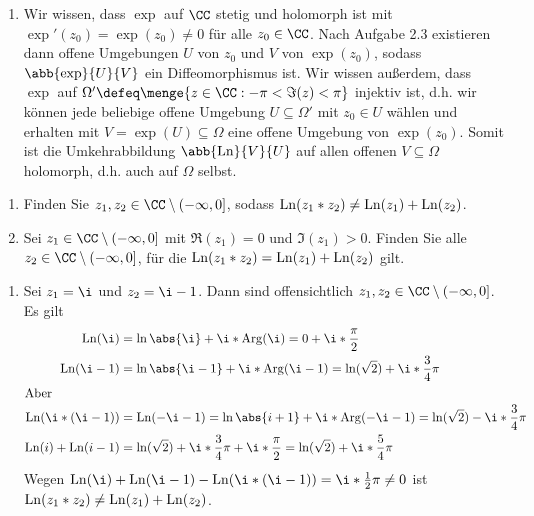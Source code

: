 \begin{exercisePage}
\begin{enumerate}[label=(zu \alph*), leftmargin=*]
		\item Wir wissen, dass $\exp$ auf $\CC$ stetig und holomorph ist mit $\exp'(z_0) = \exp(z_0) \neq 0$ für alle $z_0 \in \CC$. Nach Aufgabe 2.3 existieren dann offene Umgebungen $U$ von $z_0$ und $V$ von $\exp(z_0)$, sodass $\abb{\exp}{U}{V}$ ein Diffeomorphismus ist. 
		Wir wissen außerdem, dass $\exp$ auf $\Omega' \defeq \menge{z \in \CC : - \pi < \Im(z) < \pi}$ injektiv ist, d.h. wir können jede beliebige offene Umgebung $U \subseteq \Omega'$ mit $z_0 \in U$ wählen und erhalten mit $V = \exp(U) \subseteq \Omega$ eine offene Umgebung von $\exp(z_0)$. Somit ist die Umkehrabbildung $\abb{\Ln}{V}{U}$ auf allen offenen $V \subseteq \Omega$ holomorph, d.h. auch auf $\Omega$ selbst.
	\end{enumerate}



	\pagebreak
	
	

	\begin{task}
		\begin{enumerate}
			\item Finden Sie $z_1, z_2 \in \CC \setminus (-\infty, 0]$, sodass $\operatorname{Ln}(z_1 * z_2) \neq \operatorname{Ln}(z_1) + \operatorname{Ln}(z_2)$.
			\item Sei $z_1 \in \CC \setminus (-\infty, 0]$ mit $\Re(z_1) = 0$ und $\Im(z_1) > 0$. Finden Sie alle $z_2 \in \CC \setminus (-\infty, 0]$, für die $\operatorname{Ln}(z_1 * z_2) = \operatorname{Ln}(z_1) + \operatorname{Ln}(z_2)$ gilt.
		\end{enumerate}
	\end{task}

	\begin{enumerate}[label=(zu \alph*), leftmargin=*]
		\item Sei $z_1 = \i$ und $z_2 = \i - 1$. Dann sind offensichtlich $z_1, z_2 \in \CC \setminus (-\infty, 0]$. Es gilt
		\begin{align*}
				\Ln(\i) &= \ln\abs{\i} + \i * \Arg(\i) = 0 + \i * \frac{\pi}{2} \\
				\Ln(\i - 1) &= \ln\abs{\i - 1} + \i * \Arg(\i - 1) = \ln(\sqrt{2}) + \i * \frac{3}{4} \pi \\
			\intertext{Aber}
				\Ln(\i * (\i - 1)) &= \Ln(-\i  - 1) = \ln \abs{i + 1} + \i * \Arg(-\i - 1) = \ln(\sqrt{2}) - \i * \frac{3}{4} \pi \\
				\Ln(i) + \Ln(i-1) &= \ln(\sqrt{2}) + \i * \frac{3}{4} \pi + \i * \frac{\pi}{2} = \ln(\sqrt{2}) + \i * \frac{5}{4} \pi
		\end{align*}
		Wegen $\Ln(\i) + \Ln(\i-1) - \Ln(\i * (\i - 1)) = \i * \frac{1}{2} \pi \neq 0$ ist $\operatorname{Ln}(z_1 * z_2) \neq \operatorname{Ln}(z_1) + \operatorname{Ln}(z_2)$.
		

\end{enumerate}
\end{exercisePage}
